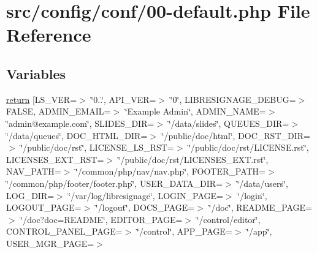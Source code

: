 \hypertarget{conf_200-default_8php}{}\section{src/config/conf/00-\/default.php File Reference}
\label{conf_200-default_8php}
\subsection*{Variables}
\begin{DoxyCompactItemize}
\item 
\hyperlink{conf_200-default_8php_aaae9415d44e44dab44a7472db38273e0}{return} \mbox{[}\textquotesingle{}L\+S\+\_\+\+V\+ER\textquotesingle{}=$>$ \char`\"{}0..\char`\"{}, \textquotesingle{}A\+P\+I\+\_\+\+V\+ER\textquotesingle{}=$>$ \char`\"{}0\char`\"{}, \textquotesingle{}L\+I\+B\+R\+E\+S\+I\+G\+N\+A\+G\+E\+\_\+\+D\+E\+B\+UG\textquotesingle{}=$>$ F\+A\+L\+SE, \textquotesingle{}A\+D\+M\+I\+N\+\_\+\+E\+M\+A\+IL\textquotesingle{}=$>$ \char`\"{}Example Admin\char`\"{}, \textquotesingle{}A\+D\+M\+I\+N\+\_\+\+N\+A\+ME\textquotesingle{}=$>$ \char`\"{}admin@example.\+com\char`\"{}, \textquotesingle{}S\+L\+I\+D\+E\+S\+\_\+\+D\+IR\textquotesingle{}=$>$ \char`\"{}/data/slides\char`\"{}, \textquotesingle{}Q\+U\+E\+U\+E\+S\+\_\+\+D\+IR\textquotesingle{}=$>$ \char`\"{}/data/queues\char`\"{}, \textquotesingle{}D\+O\+C\+\_\+\+H\+T\+M\+L\+\_\+\+D\+IR\textquotesingle{}=$>$ \char`\"{}/public/doc/html\char`\"{}, \textquotesingle{}D\+O\+C\+\_\+\+R\+S\+T\+\_\+\+D\+IR\textquotesingle{}=$>$ \char`\"{}/public/doc/rst\char`\"{}, \textquotesingle{}L\+I\+C\+E\+N\+S\+E\+\_\+\+L\+S\+\_\+\+R\+ST\textquotesingle{}=$>$ \char`\"{}/public/doc/rst/L\+I\+C\+E\+N\+S\+E.\+rst\char`\"{}, \textquotesingle{}L\+I\+C\+E\+N\+S\+E\+S\+\_\+\+E\+X\+T\+\_\+\+R\+ST\textquotesingle{}=$>$ \char`\"{}/public/doc/rst/L\+I\+C\+E\+N\+S\+E\+S\+\_\+\+E\+X\+T.\+rst\char`\"{}, \textquotesingle{}N\+A\+V\+\_\+\+P\+A\+TH\textquotesingle{}=$>$ \char`\"{}/common/php/nav/nav.\+php\char`\"{}, \textquotesingle{}F\+O\+O\+T\+E\+R\+\_\+\+P\+A\+TH\textquotesingle{}=$>$ \char`\"{}/common/php/footer/footer.\+php\char`\"{}, \textquotesingle{}U\+S\+E\+R\+\_\+\+D\+A\+T\+A\+\_\+\+D\+IR\textquotesingle{}=$>$ \char`\"{}/data/users\char`\"{}, \textquotesingle{}L\+O\+G\+\_\+\+D\+IR\textquotesingle{}=$>$ \char`\"{}/var/log/libresignage\char`\"{}, \textquotesingle{}L\+O\+G\+I\+N\+\_\+\+P\+A\+GE\textquotesingle{}=$>$ \char`\"{}/login\char`\"{}, \textquotesingle{}L\+O\+G\+O\+U\+T\+\_\+\+P\+A\+GE\textquotesingle{}=$>$ \char`\"{}/logout\char`\"{}, \textquotesingle{}D\+O\+C\+S\+\_\+\+P\+A\+GE\textquotesingle{}=$>$ \char`\"{}/doc\char`\"{}, \textquotesingle{}R\+E\+A\+D\+M\+E\+\_\+\+P\+A\+GE\textquotesingle{}=$>$ \char`\"{}/doc?doc=R\+E\+A\+D\+ME\char`\"{}, \textquotesingle{}E\+D\+I\+T\+O\+R\+\_\+\+P\+A\+GE\textquotesingle{}=$>$ \char`\"{}/control/editor\char`\"{}, \textquotesingle{}C\+O\+N\+T\+R\+O\+L\+\_\+\+P\+A\+N\+E\+L\+\_\+\+P\+A\+GE\textquotesingle{}=$>$ \char`\"{}/control\char`\"{}, \textquotesingle{}A\+P\+P\+\_\+\+P\+A\+GE\textquotesingle{}=$>$ \char`\"{}/app\char`\"{}, \textquotesingle{}U\+S\+E\+R\+\_\+\+M\+G\+R\+\_\+\+P\+A\+GE\textquotesingle{}=$>$ 
\end{DoxyCompactItemize}
